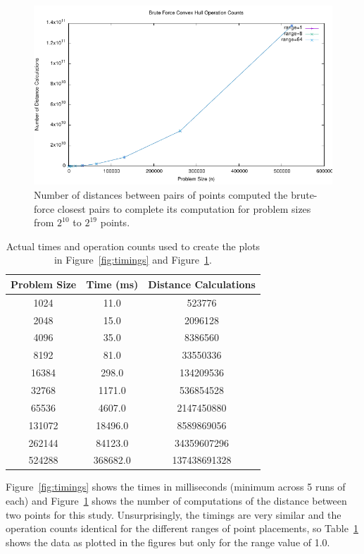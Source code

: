 \documentclass[12pt]{article}
\begin{document}
\begin{figure}[htb]
  \centering
  \includegraphics{bfcp-opcounts.pdf}
  \caption{Number of distances between pairs of points computed the
    brute-force closest pairs to complete its computation for problem
    sizes from $2^{10}$ to $2^{19}$ points.}
  \label{fig:opcounts}
\end{figure}

\begin{table}[htb]
  \centering
  \begin{tabular}{|c|c|c|}
    \hline
    Problem Size & Time (ms) & Distance Calculations \\ \hline \hline
1024 & 11.0 & 523776 \\ \hline
2048 & 15.0 & 2096128 \\ \hline
4096 & 35.0 & 8386560 \\ \hline
8192 & 81.0 & 33550336 \\ \hline
16384 & 298.0 & 134209536 \\ \hline
32768 & 1171.0 & 536854528 \\ \hline
65536 & 4607.0 & 2147450880 \\ \hline
131072 & 18496.0 & 8589869056 \\ \hline
262144 & 84123.0 & 34359607296 \\ \hline
524288 & 368682.0 & 137438691328 \\ \hline
  \end{tabular}
  \caption{Actual times and operation counts used to create the plots
    in Figure~\ref{fig:timings} and Figure~\ref{fig:opcounts}.}
  \label{tab:rawdata}
\end{table}

Figure~\ref{fig:timings} shows the times in milliseconds (minimum
across 5 runs of each) and Figure~\ref{fig:opcounts} shows the number
of computations of the distance between two points for this study.
Unsurprisingly, the timings are very similar and the operation counts
identical for the different ranges of point placements, so
Table~\ref{tab:rawdata} shows the data as plotted in the figures but
only for the range value of 1.0.
\end{document}
